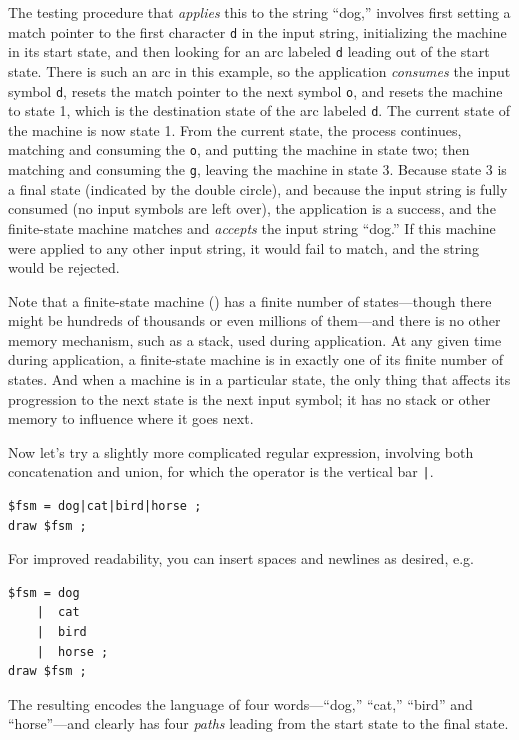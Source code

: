 The testing procedure that \emph{applies} this \fsm{} to the string ``dog,'' involves
first setting a match pointer to the first character \texttt{d} in the input string, 
initializing the machine in
its start state, and then looking for an arc labeled \texttt{d} leading out of the
start state.  There is such an arc in this example, so the application 
\emph{consumes} the input symbol \texttt{d}, resets the match pointer to the next
symbol \texttt{o}, and resets
the machine to state 1,
which is the destination state of the arc labeled \texttt{d}.
The current
state of the machine is now state 1.  From the current state, the
process continues, matching and consuming the \texttt{o}, and putting the machine in
state two; then matching and consuming the \texttt{g}, leaving the machine in state 3.
Because state 3 is a final state (indicated by the double circle), and because the input 
string is fully consumed (no input symbols are left over), the
application is a success, and the finite-state machine matches and \emph{accepts} the input string
``dog.''  If this machine were applied to any other input string, it would fail to match, and the
string would be rejected.   

Note that a finite-state machine (\fsm{}) has a finite number of states---though there
might be hundreds of thousands or even millions of them---and there is no other memory
mechanism, such as a stack, used during application.  At any given time during
application, a finite-state machine is in exactly one of its finite number of states.
And when a machine is in a particular state, the only thing that affects its
progression
to the next state is the next input symbol; it has no stack or other memory to
influence where it goes next.

Now let's try a slightly more complicated regular expression, involving both
concatenation and union, for which the operator is the vertical bar \verb!|!. 

\begin{Verbatim}
$fsm = dog|cat|bird|horse ;
draw $fsm ;
\end{Verbatim}

\noindent
For improved readability, you can insert spaces and newlines as desired, e.g.

\begin{Verbatim}
$fsm = dog
    |  cat
    |  bird
    |  horse ;
draw $fsm ;
\end{Verbatim}

\noindent
The resulting \fsm{} encodes the language of four words---``dog,'' ``cat,'' ``bird''
and ``horse''---and clearly has four \emph{paths} leading from the start state to the
final state.


